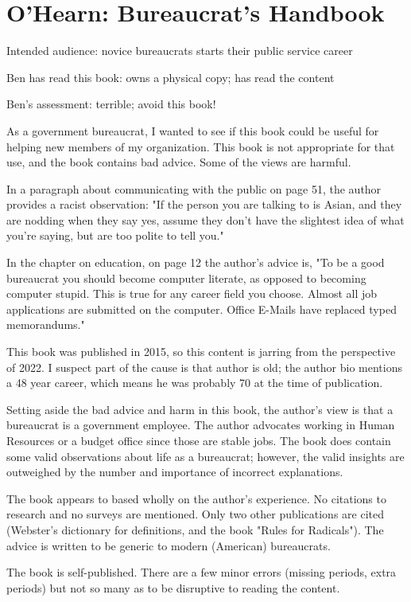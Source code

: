 \section{O'Hearn: Bureaucrat's Handbook\label{review:ohearn_handbook}}

\cite{2015_OHearn}

Intended audience: novice bureaucrats starts their public service career

Ben has read this book: owns a physical copy; has read the content

Ben's assessment: terrible; avoid this book!


As a government bureaucrat, I wanted to see if this book could be useful for helping new members of my organization. This book is not appropriate for that use, and the book contains bad advice. Some of the views are harmful. 



In a paragraph about communicating with the public on page 51, the author provides a racist observation: "If the person you are talking to is Asian, and they are nodding when they say yes, assume they don't have the slightest idea of what you're saying, but are too polite to tell you."



In the chapter on education, on page 12 the author's advice is, "To be a good bureaucrat you should become computer literate, as opposed to becoming computer stupid. This is true for any career field you choose. Almost all job applications are submitted on the computer. Office E-Mails have replaced typed memorandums." 



This book was published in 2015, so this content is jarring from the perspective of 2022. I suspect part of the cause is that author is old; the author bio mentions a 48 year career, which means he was probably 70 at the time of publication. 



Setting aside the bad advice and harm in this book, the author's view is that a bureaucrat is a government employee. The author advocates working in Human Resources or a budget office since those are stable jobs. The book does contain some valid observations about life as a bureaucrat; however, the valid insights are outweighed by the number and importance of incorrect explanations. 



The book appears to based wholly on the author's experience. No citations to research and no surveys are mentioned. Only two other publications are cited (Webster's dictionary for definitions, and the book "Rules for Radicals").  The advice is written to be generic to modern (American) bureaucrats. 



The book is self-published. There are a few minor errors (missing periods, extra periods) but not so many as to be disruptive to reading the content. 
